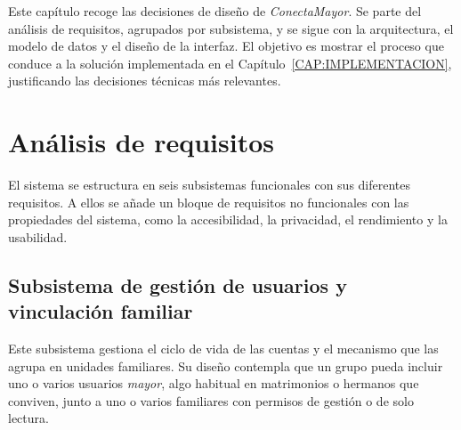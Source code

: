 
Este capítulo recoge las decisiones de diseño de \emph{ConectaMayor}. Se
parte del análisis de requisitos, agrupados por subsistema, y se sigue con la arquitectura, el modelo de datos y el diseño de la interfaz. El
objetivo es mostrar el proceso que conduce a la solución implementada en
el Capítulo~\ref{CAP:IMPLEMENTACION}, justificando las decisiones técnicas
más relevantes.


\section{Análisis de requisitos\label{SEC:DIS_REQUISITOS}}

El sistema se estructura en seis subsistemas funcionales con sus diferentes requisitos. A ellos se añade un bloque de
requisitos no funcionales con las propiedades del sistema,
como la accesibilidad, la privacidad, el rendimiento y la usabilidad.

\subsection{Subsistema de gestión de usuarios y vinculación
familiar\label{SUB:REQ_USUARIOS}}

Este subsistema gestiona el ciclo de vida de las cuentas y el mecanismo
que las agrupa en unidades familiares. Su diseño contempla que un grupo
pueda incluir uno o varios usuarios \emph{mayor}, algo habitual en
matrimonios o hermanos que conviven, junto a uno o varios familiares con
permisos de gestión o de solo lectura.

